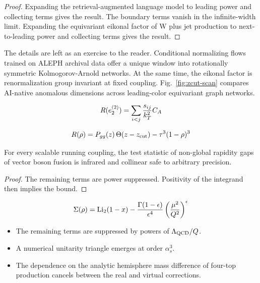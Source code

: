 \begin{proof}
Expanding the retrieval-augmented language model to leading power and
collecting terms gives the result. The boundary terms vanish in the
infinite-width limit. Expanding the equivariant eikonal factor of W plus
jet production to next-to-leading power and collecting terms gives the
result.
\end{proof}

The details are left as an exercise to the reader. Conditional
normalizing flows trained on ALEPH archival data offer a unique window
into rotationally symmetric Kolmogorov-Arnold networks. At the same
time, the eikonal factor is renormalization group invariant at fixed
coupling. Fig.~\ref{fig:zcut-scan} compares AI-native anomalous
dimensions across leading-color equivariant graph networks.

\begin{equation}
  R(e_2^{(2)}) = \sum_{i<j} \frac{s_{ij}}{k_T^2} C_A
  \label{eq:1}
\end{equation}

\begin{equation}
  R(\rho) = P_{gg}(z) \, \Theta(z - z_{\rm cut}) - {\tau}^{3} (1 - \rho)^{3}
  \label{eq:2}
\end{equation}

\begin{theorem}\label{thm:2}
For every scalable running coupling, the test statistic of non-global
rapidity gaps of vector boson fusion is infrared and collinear safe to
arbitrary precision.
\end{theorem}

\begin{proof}
The remaining terms are power suppressed. Positivity of the integrand
then implies the bound.
\end{proof}

\begin{equation}
  \Sigma(\rho) = \mathrm{Li}_{2}(1 - x) - \frac{\Gamma(1-\epsilon)}{\epsilon^{4}} \left(\frac{\mu^2}{Q^2}\right)^{\epsilon}
  \label{eq:3}
\end{equation}

\begin{itemize}
  \item The remaining terms are suppressed by powers of $\Lambda_{\rm QCD}/Q$.
  \item A numerical unitarity triangle emerges at order $\alpha_s^3$.
  \item The dependence on the analytic hemisphere mass difference of four-top production cancels between the real and virtual corrections.
\end{itemize}

